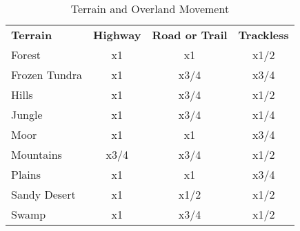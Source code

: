 \begin{table}[htb]
\caption{Terrain and Overland Movement}
\centering
\begin{tabular}{l c c c}
\textbf{Terrain} & \textbf{Highway} & \textbf{Road or Trail} & \textbf{Trackless}\\
Forest & x1 & x1 & x1/2\\
Frozen Tundra & x1 & x3/4 & x3/4\\
Hills & x1 & x3/4 & x1/2\\
Jungle & x1 & x3/4 & x1/4\\
Moor & x1 & x1 & x3/4\\
Mountains & x3/4 & x3/4 & x1/2\\
Plains & x1 & x1 & x3/4\\
Sandy Desert & x1 & x1/2 & x1/2\\
Swamp & x1 & x3/4 & x1/2\\
\end{tabular}
\end{table}

